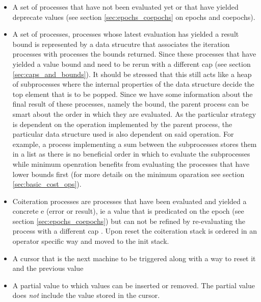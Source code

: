 \begin{itemize}
\item A set of  processes that have not been evaluated
  yet or that have yielded deprecate values (see section
  \ref{sec:epochs_coepochs} on epochs and coepochs).
\item A set of  processes, processes whose latest
  evaluation has yielded a result bound is represented by a data
  strucutre that associates the iteration processes with
   processes the bounds returned. Since these processes
  that have yielded a value bound and need to be rerun with a
  different cap (see section \ref{sec:caps_and_bounds}). It should be
  stressed that this still acts like a heap of subprocesses where the
  internal properties of the data structure decide the top element
  that is to be popped. Since we have some information about the final
  result of these processes, namely the bound, the parent process can
  be smart about the order in which they are evaluated. As the
  particular strategy is dependent on the operation implemented by the
  parent process, the particular data structure used is also dependent
  on said operation. For example, a process implementing a sum between
  the subprocesses stores them in a list as there is no beneficial
  order in which to evaluate the subprocesses while minimum openration
  benefits from evaluating the processes that have lower bounds first
  (for more details on the minimum oparation see section
  \ref{sec:basic_cost_ops}).
\item Coiteration processes are processes that have been evaluated and
  yielded a concrete e (error or result), ie a value that is
  predicated on the epoch (see section \ref{sec:epochs_coepochs}) but
  can not be refined by re-evaluating the process with a different cap
  . Upon reset the coiteration
  stack is ordered in an operator specific way and moved to the init
  stack.
\item A cursor that is the next machine to be triggered along with a
  way to reset it and the previous value
\item A partial value to which values can be inserted or removed. The
  partial value does \emph{not} include the value stored in the
  cursor.
\end{itemize}

